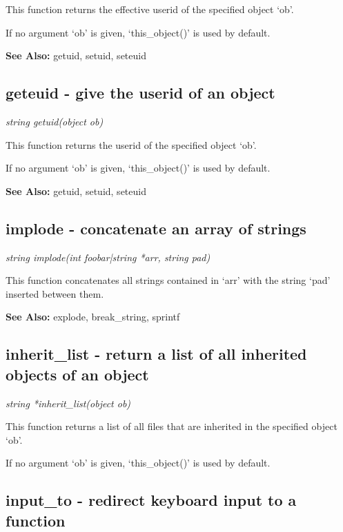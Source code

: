     This function returns the effective userid of the specified 
    object `ob'. 

    If no argument `ob' is given, `this\_object()' is used by default.

    {\bf See Also: }    getuid, setuid, seteuid



\subsection{geteuid - give the userid of an object}

    {\em string getuid(object ob)}

    This function returns the userid of the specified object `ob'.

    If no argument `ob' is given, `this\_object()' is used by default.

    {\bf See Also: }    getuid, setuid, seteuid



\subsection{implode - concatenate an array of strings}

    {\em string implode(int foobar|string *arr, string pad)}

    This function concatenates all strings contained in `arr' with
    the string `pad' inserted between them.

    {\bf See Also: }    explode, break\_string, sprintf



\subsection{inherit\_list - return a list of all inherited objects of an object}

    {\em string *inherit\_list(object ob)}

    This function returns a list of all files that are inherited in
    the specified object `ob'.

    If no argument `ob' is given, `this\_object()' is used by default.



\subsection{input\_to - redirect keyboard input to a function}

